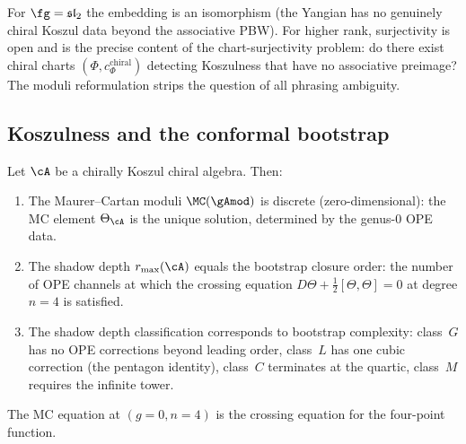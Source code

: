 \begin{remark}
\label{rem:fm161-honest}

For $\fg = \mathfrak{sl}_2$ the embedding is an isomorphism
(the Yangian has no genuinely chiral Koszul data beyond the
associative PBW). For higher rank, surjectivity is open and is
the precise content of the chart-surjectivity problem: do there exist
chiral charts
$(\Phi, c^{\mathrm{chiral}}_\Phi)$ detecting Koszulness that
have no associative preimage? The moduli reformulation strips
the question of all phrasing ambiguity.
\end{remark}

\subsection{Koszulness and the conformal bootstrap}
\label{subsec:koszulness-bootstrap}

\begin{theorem}
\label{thm:koszulness-bootstrap}
Let $\cA$ be a chirally Koszul chiral algebra. Then:
\begin{enumerate}[label=\textup{(\roman*)}]
\item The Maurer--Cartan moduli $\MC(\gAmod)$ is discrete
 \textup{(}zero-dimensional\textup{)}: the MC element
 $\Theta_\cA$ is the unique solution, determined by the
 genus-$0$ OPE data.
\item The shadow depth $r_{\max}(\cA)$ equals the bootstrap
 closure order: the number of OPE channels at which the
 crossing equation
 $D\Theta + \tfrac{1}{2}[\Theta,\Theta] = 0$ at degree
 $n = 4$ is satisfied.
\item The shadow depth classification corresponds to bootstrap
 complexity:
 class~$G$ has no OPE corrections beyond leading order,
 class~$L$ has one cubic correction
 \textup{(}the pentagon identity\textup{)},
 class~$C$ terminates at the quartic,
 class~$M$ requires the infinite tower.
\end{enumerate}
The MC equation at $(g{=}0, n{=}4)$ is the crossing equation
for the four-point function.
\end{theorem}

